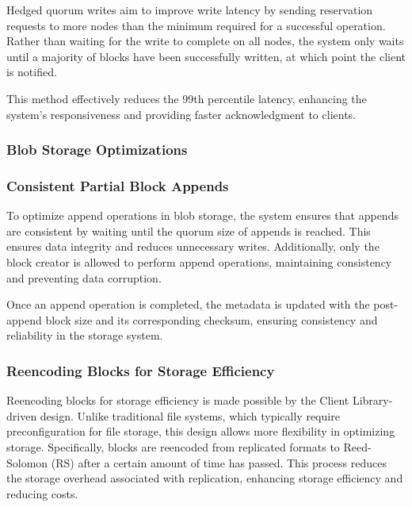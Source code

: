 Hedged quorum writes aim to improve write latency by sending reservation requests to more nodes than the minimum required for a successful operation. Rather than waiting for the write to complete on all nodes, the system only waits until a majority of blocks have been successfully written, at which point the client is notified. 

This method effectively reduces the 99th percentile latency, enhancing the system's responsiveness and providing faster acknowledgment to clients.

\subsubsection{Blob Storage Optimizations}\label{sec:blob_storage_optimization}

\subsubsection*{Consistent Partial Block Appends}

To optimize append operations in blob storage, the system ensures that appends are consistent by waiting until the quorum size of appends is reached. This ensures data integrity and reduces unnecessary writes. Additionally, only the block creator is allowed to perform append operations, maintaining consistency and preventing data corruption.

Once an append operation is completed, the metadata is updated with the post-append block size and its corresponding checksum, ensuring consistency and reliability in the storage system.

\subsubsection*{Reencoding Blocks for Storage Efficiency}

Reencoding blocks for storage efficiency is made possible by the Client Library-driven design. Unlike traditional file systems, which typically require preconfiguration for file storage, this design allows more flexibility in optimizing storage. Specifically, blocks are reencoded from replicated formats to Reed-Solomon (RS) after a certain amount of time has passed. This process reduces the storage overhead associated with replication, enhancing storage efficiency and reducing costs.
